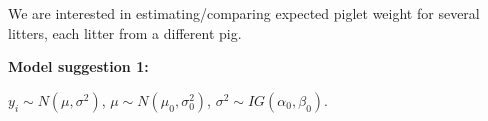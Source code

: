 \begin{frame}
\begin{analysis}
\begin{minipage}[r]{0.65\linewidth}
\begin{center}
\begin{tiny}
\begin{tabular}{rrrrrrrr}
   \hline
   \hline
\end{tabular}
\end{tiny}
\end{center}
\end{minipage}

\bigskip

We are interested in estimating/comparing expected piglet weight for several litters, each litter from a different pig.

\bigskip

\bigskip

\end{analysis}
\end{frame}



\begin{frame}
\begin{analysis}

\bigskip

\textbf{Model suggestion 1:}

\bigskip

\smallskip

$ y_i \sim N(\mu, \sigma^2)$, $ \mu \sim N(\mu_0, \sigma_0^2)$, $ \sigma^2 \sim IG(\alpha_0, \beta_0).$

\bigskip

\bigskip

\begin{center}
\end{center}

\smallskip

\end{analysis}
\end{frame}

